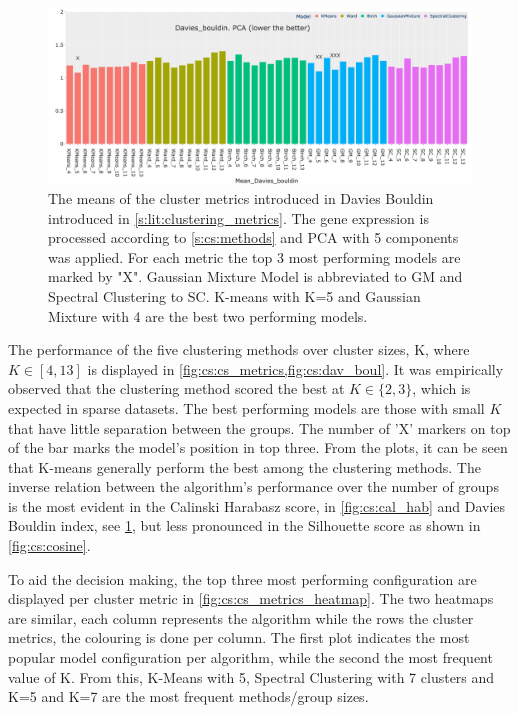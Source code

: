\begin{figure}[!htb]    
    \centering
    \includegraphics[width=1.0\textwidth,keepaspectratio]{Sections/ClusteringAnalysis/Resources/cs_top3/PCA_top3_Davies_bouldin.png}
    \caption[Measuring clustering models: Davies Bouldin]{The means of the cluster metrics introduced in Davies Bouldin introduced in \cref{s:lit:clustering_metrics}. The gene expression is processed according to \cref{s:cs:methods} and PCA with 5 components was applied. For each metric the top 3 most performing models are marked by "X". Gaussian Mixture Model is abbreviated to GM and Spectral Clustering to SC. K-means with K=5 and Gaussian Mixture with 4 are the best two performing models.}
    \label{fig:cs:dav_boul}
\end{figure}

The performance of the five clustering methods over cluster sizes, K, where $K\in[4, 13]$ is displayed in \cref{fig:cs:cs_metrics,fig:cs:dav_boul}. It was empirically observed that the clustering method scored the best at $K\in\{2,3\}$, which is expected in sparse datasets. The best performing models are those with small $K$ that have little separation between the groups. The number of 'X' markers on top of the bar marks the model's position in top three. From the plots, it can be seen that K-means generally perform the best among the clustering methods. The inverse relation between the algorithm's performance over the number of groups is the most evident in the Calinski Harabasz score, in \cref{fig:cs:cal_hab} and Davies Bouldin index, see \cref{fig:cs:dav_boul}, but less pronounced in the Silhouette score as shown in \cref{fig:cs:cosine}.


To aid the decision making, the top three most performing configuration are displayed per cluster metric in \cref{fig:cs:cs_metrics_heatmap}. The two heatmaps are similar, each column represents the algorithm while the rows the cluster metrics, the colouring is done per column. The first plot indicates the most popular model configuration per algorithm, while the second the most frequent value of K. From this, K-Means with 5, Spectral Clustering with 7 clusters and K=5 and K=7 are the most frequent methods/group sizes. 

